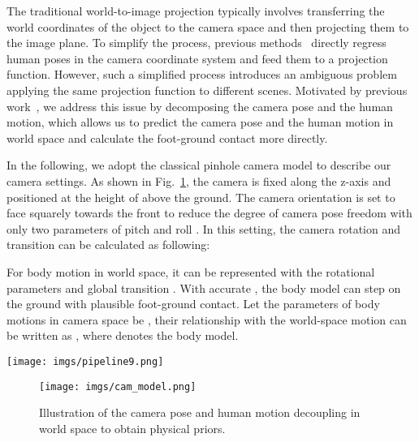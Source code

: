 \documentclass[10pt,twocolumn,letterpaper]{article}
\begin{document}
The traditional world-to-image projection typically involves transferring the world coordinates of the object to the camera space and then projecting them to the image plane.
To simplify the process, previous methods~\cite{videopose3d2020, poseformer2021, PoseTriplet2022,kanazawa2018end, kolotouros2019learning, zhang2021pymaf} directly regress human poses in the camera coordinate system and feed them to a projection function.
However, such a simplified process introduces an ambiguous problem applying the same projection function to different scenes.
Motivated by previous work~\cite{kocabas2021spec, 2022Ray3D}, we address this issue by decomposing the camera pose and the human motion, which allows us to predict the camera pose and the human motion in world space and calculate the foot-ground contact more directly.



In the following, we adopt the classical pinhole camera model to describe our camera settings.
As shown in Fig.~\ref{fig:cam_model}, the camera is fixed along the z-axis and positioned at the height of  above the ground.
The camera orientation is set to face squarely towards the front to reduce the degree of camera pose freedom with only two parameters of pitch  and roll .
In this setting, the camera rotation  and transition  can be calculated as following:


For body motion in world space, it can be represented with the rotational parameters  and global transition . 
With accurate , the body model can step on the ground  with plausible foot-ground contact.
Let the parameters of body motions in camera space be , their relationship with the world-space motion can be written as , where  denotes the body model.

\begin{figure*}[ht!]
    \centering
    \texttt{[image: imgs/pipeline9.png]}
    \caption{Illustration of the proposed method. 
    Our method takes the estimated 2D skeleton poses of the body and hand as inputs and recovers the 3D motions with plausible foot-ground contact in world space. 
    }
\label{fig:overview_pipeline}
    \vspace{-1mm}
\end{figure*}

\begin{figure}[ht!]
    \centering
    \texttt{[image: imgs/cam\_model.png]}
    \caption{Illustration of the camera pose and human motion decoupling in world space to obtain physical priors.}
\label{fig:cam_model}
    \vspace{-1mm}
\end{figure}
\end{document}
